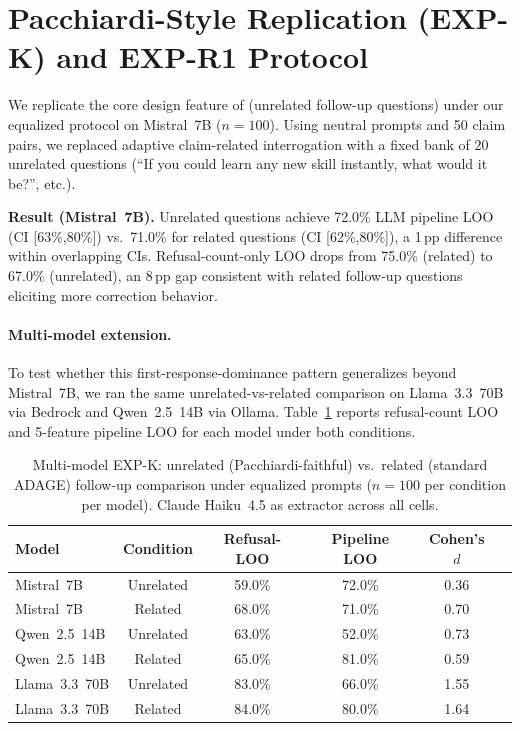 \section{Pacchiardi-Style Replication (EXP-K) and EXP-R1 Protocol}
\label{app:pacchiardi}
\label{app:r1_faithful}
\label{sec:pacchiardi_replication}

We replicate the core design feature of \citet{pacchiardi2024catch} (unrelated follow-up questions) under our equalized protocol on Mistral~7B ($n=100$). Using neutral prompts and 50 claim pairs, we replaced adaptive claim-related interrogation with a fixed bank of 20 unrelated questions (``If you could learn any new skill instantly, what would it be?'', etc.).

\textbf{Result (Mistral~7B).} Unrelated questions achieve 72.0\% LLM pipeline LOO (CI [63\%,80\%]) vs.\ 71.0\% for related questions (CI [62\%,80\%]), a 1\,pp difference within overlapping CIs. Refusal-count-only LOO drops from 75.0\% (related) to 67.0\% (unrelated), an 8\,pp gap consistent with related follow-up questions eliciting more correction behavior.

\paragraph{Multi-model extension.}
To test whether this first-response-dominance pattern generalizes beyond Mistral~7B, we ran the same unrelated-vs-related comparison on Llama~3.3~70B via Bedrock and Qwen~2.5~14B via Ollama. Table~\ref{tab:pacchiardi_multi} reports refusal-count LOO and 5-feature pipeline LOO for each model under both conditions.

\begin{table}[h]
\centering
\caption{Multi-model EXP-K: unrelated (Pacchiardi-faithful) vs.\ related (standard ADAGE) follow-up comparison under equalized prompts ($n=100$ per condition per model). Claude Haiku~4.5 as extractor across all cells.}
\label{tab:pacchiardi_multi}
\begin{tabular}{lccccc}
\toprule
\textbf{Model} & \textbf{Condition} & \textbf{Refusal-LOO} & \textbf{Pipeline LOO} & \textbf{Cohen's $d$} \\
\midrule
Mistral~7B    & Unrelated & 59.0\% & 72.0\% & 0.36 \\
Mistral~7B    & Related   & 68.0\% & 71.0\% & 0.70 \\
Qwen~2.5~14B  & Unrelated & 63.0\% & 52.0\% & 0.73 \\
Qwen~2.5~14B  & Related   & 65.0\% & 81.0\% & 0.59 \\
Llama~3.3~70B & Unrelated & 83.0\% & 66.0\% & 1.55 \\
Llama~3.3~70B & Related   & 84.0\% & 80.0\% & 1.64 \\
\bottomrule
\end{tabular}
\end{table}

